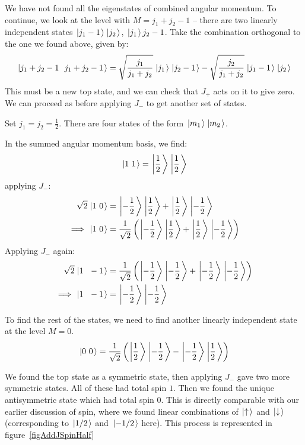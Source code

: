 \documentclass[../Main.tex]{subfiles}
\begin{document}
We have not found all the eigenstates of combined angular momentum. To continue, we look at the level with $M = j_1 + j_2 - 1$ -- there are two linearly independent states $\left.\left|j_1 - 1\right.\right\rangle\left.\left|j_2\right.\right\rangle$, $\left.\left|j_1\right.\right\rangle{j_2 - 1}$. Take the combination orthogonal to the one we found above, given by:
\begin{equation*}
    \left.\left|j_1 + j_2 - 1~~j_1 + j_2 - 1\right.\right\rangle = \sqrt{\frac{j_1}{j_1 + j_2}} \left.\left|j_1\right.\right\rangle\left.\left|j_2 - 1\right.\right\rangle - \sqrt{\frac{j_2}{j_1 + j_2}} \left.\left|j_1 - 1\right.\right\rangle\left.\left|j_2\right.\right\rangle
\end{equation*}
This must be a new top state, and we can check that $J_+$ acts on it to give zero. We can proceed as before applying $J_-$ to get another set of states.
\begin{example}
    Set $j_1 = j_2 = \frac12$. There are four states of the form $\left.\left|m_1\right.\right\rangle\left.\left|m_2\right.\right\rangle$.

    In the summed angular momentum basis, we find:
    \begin{equation*}
        \left.\left|1~1\right.\right\rangle = \left.\left|\frac12\right.\right\rangle \left.\left|\frac12\right.\right\rangle
    \end{equation*}
    applying $J_-$:
    \begin{align*}
        \sqrt{2} \left.\left|1~0\right.\right\rangle &= \left.\left|-\frac12\right.\right\rangle \left.\left|\frac12\right.\right\rangle + \left.\left|\frac12\right.\right\rangle \left.\left|-\frac12\right.\right\rangle \\
        \implies \left.\left|1~0\right.\right\rangle &= \frac1{\sqrt{2}} \left(\left.\left|-\frac12\right.\right\rangle \left.\left|\frac12\right.\right\rangle + \left.\left|\frac12\right.\right\rangle \left.\left|-\frac12\right.\right\rangle\right)
    \end{align*}
    Applying $J_-$ again:
    \begin{align*}
        \sqrt{2} \left.\left|1~~-1\right.\right\rangle &= \frac1{\sqrt{2}} \left(\left.\left|-\frac12\right.\right\rangle\left.\left|-\frac12\right.\right\rangle + \left.\left|-\frac12\right.\right\rangle \left.\left|-\frac12\right.\right\rangle\right) \\
        \implies \left.\left|1~~-1\right.\right\rangle &= \left.\left|-\frac12\right.\right\rangle \left.\left|-\frac12\right.\right\rangle
    \end{align*}

    To find the rest of the states, we need to find another linearly independent state at the level $M = 0$.
    \begin{equation*}
        \left.\left|0~0\right.\right\rangle = \frac1{\sqrt{2}} \left(\left.\left|\frac12\right.\right\rangle \left.\left|-\frac12\right.\right\rangle - \left.\left|-\frac12\right.\right\rangle \left.\left|\frac12\right.\right\rangle\right)
    \end{equation*}

    We found the top state as a symmetric state, then applying $J_-$ gave two more symmetric states. All of these had total spin $1$. Then we found the unique antisymmetric state which had total spin $0$. This is directly comparable with our earlier discussion of spin, where we found linear combinations of $\left.\left|\uparrow\right.\right\rangle$ and $\left.\left|\downarrow\right.\right\rangle$ (corresponding to $\left.\left|1/2\right.\right\rangle$ and $\left.\left|-1/2\right.\right\rangle$ here). This process is represented in figure~\ref{figAddJSpinHalf}
\end{example}
\end{document}
